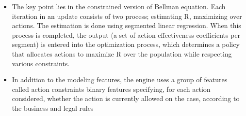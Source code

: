 \documentclass{article}
\theoremstyle{remark}
\theoremstyle{remark}
\theoremstyle{remark}
\theoremstyle{remark}
\theoremstyle{remark}
\theoremstyle{remark}
\begin{document}
\begin{itemize}
	\item The key point lies in the constrained version of Bellman equation. Each iteration in an update consists of two process; estimating R, maximizing over actions. The estimation is done using segmented linear regression. When this process is completed, the output (a set of action effectiveness coefficients per segment) is entered into the optimization process, which determines a policy that allocates actions to maximize R over the population while respecting various constraints.
	\item In addition to the modeling features, the engine uses a group of features called action constraints binary features specifying, for each action considered, whether the action is currently allowed on the case, according to the business and legal rules


\end{itemize}




\end{document}
